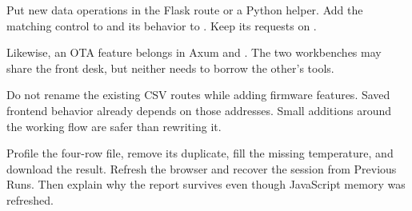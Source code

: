 Put new data operations in the Flask route or a Python helper. Add the matching control to  and its behavior to . Keep its requests on .

Likewise, an OTA feature belongs in Axum and . The two workbenches may share the front desk, but neither needs to borrow the other's tools.

\begin{warningbox}
Do not rename the existing CSV routes while adding firmware features. Saved frontend behavior already depends on those addresses. Small additions around the working flow are safer than rewriting it.
\end{warningbox}

\begin{checkpoint}
Profile the four-row file, remove its duplicate, fill the missing temperature, and download the result. Refresh the browser and recover the session from Previous Runs. Then explain why the report survives even though JavaScript memory was refreshed.
\end{checkpoint}

